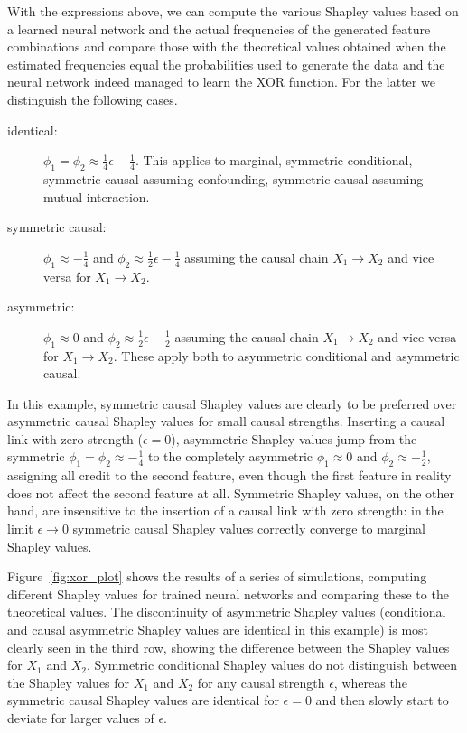 \documentclass{article}
\begin{document}
With the expressions above, we can compute the various Shapley values based on a learned neural network and the actual frequencies of the generated feature combinations and compare those with the theoretical values obtained when the estimated frequencies equal the probabilities used to generate the data and the neural network indeed managed to learn the XOR function. For the latter we distinguish the following cases.
\begin{description}
	\item[identical:] $\phi_1 = \phi_2 \approx \frac{1}{4} \epsilon - \frac{1}{4}$. This applies to marginal, symmetric conditional, symmetric causal assuming confounding, symmetric causal assuming mutual interaction.
	\item[symmetric causal:] $\phi_1 \approx -\frac{1}{4}$ and $\phi_2 \approx \frac{1}{2}\epsilon - \frac{1}{4}$ assuming the causal chain $X_1 \rightarrow X_2$ and vice versa for $X_1 \rightarrow X_2$.
	\item[asymmetric:] $\phi_1 \approx 0$ and $\phi_2 \approx \frac{1}{2}\epsilon - \frac{1}{2}$ assuming the causal chain $X_1 \rightarrow X_2$ and vice versa for $X_1 \rightarrow X_2$. These apply both to asymmetric conditional and asymmetric causal.
\end{description}

In this example, symmetric causal Shapley values are clearly to be preferred over asymmetric causal Shapley values for small causal strengths. Inserting a causal link with zero strength ($\epsilon = 0$), asymmetric Shapley values jump from the symmetric $\phi_1 = \phi_2 \approx -\frac{1}{4}$ to the completely asymmetric $\phi_1 \approx 0$ and $\phi_2 \approx - \frac{1}{2}$, assigning all credit to the second feature, even though the first feature in reality does not affect the second feature at all. Symmetric Shapley values, on the other hand, are insensitive to the insertion of a causal link with zero strength: in the limit $\epsilon \rightarrow 0$ symmetric causal Shapley values correctly converge to marginal Shapley values.

Figure~\ref{fig:xor_plot} shows the results of a series of simulations, computing different Shapley values for trained neural networks and comparing these to the theoretical values. The discontinuity of asymmetric Shapley values (conditional and causal asymmetric Shapley values are identical in this example) is most clearly seen in the third row, showing the difference between the Shapley values for $X_1$ and $X_2$. Symmetric conditional Shapley values do not distinguish between the Shapley values for $X_1$ and $X_2$ for any causal strength $\epsilon$, whereas the symmetric causal Shapley values are identical for $\epsilon = 0$ and then slowly start to deviate for larger values of $\epsilon$.
\end{document}
